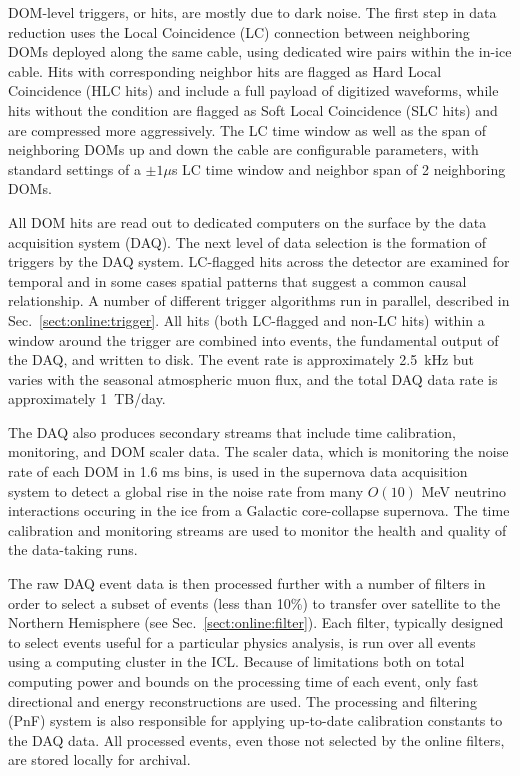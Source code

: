 DOM-level triggers, or hits, are mostly due to dark noise. The first
step in data reduction uses the Local Coincidence (LC) connection between neighboring
DOMs deployed along the same cable, using dedicated wire pairs within the
in-ice cable.  Hits with corresponding
neighbor hits are flagged as Hard Local Coincidence (HLC hits) and
include a full payload of digitized waveforms, while hits without the
condition are flagged as Soft Local Coincidence (SLC hits) and are compressed more aggressively.  The LC time window
as well as the span of neighboring DOMs up and down the cable are
configurable parameters,
with standard settings of a $\pm1 \mu$s LC time window and neighbor
span of 2 neighboring DOMs.

All DOM hits are read out to dedicated computers on the surface by the data
acquisition system (DAQ).  The next level of data selection is the
formation of triggers by the DAQ system.  LC-flagged hits across the
detector are examined for temporal and in some cases spatial patterns that
suggest a common causal relationship.  A number of different trigger
algorithms run in parallel, described in Sec.~\ref{sect:online:trigger}.  All hits
(both LC-flagged and non-LC hits) within a window around the trigger are
combined into events, the fundamental output of the DAQ, and written
to disk.  The event rate is approximately 2.5~kHz but varies with the
seasonal atmospheric muon flux, and the total DAQ data rate is approximately
1~TB/day.

The DAQ also produces secondary streams that include time
calibration, monitoring, and DOM scaler data.  The scaler data, which is
monitoring the noise rate of each DOM in 1.6 ms bins, is used in the
supernova data acquisition system \cite{IC3:supernova} to detect a
global rise in the noise rate from
many $O(10)$ MeV neutrino interactions occuring in the ice from a
Galactic core-collapse supernova.  The time calibration and monitoring
streams are used to monitor the health and quality of the data-taking runs.

The raw DAQ event data is then processed further with a number of
filters in order to select a subset of events (less than 10\%) to
transfer over satellite to the Northern Hemisphere (see
Sec.~\ref{sect:online:filter}).  Each
filter, typically designed to select events useful for a particular physics
analysis, is run
over all events using a computing cluster in the ICL.  Because of
limitations both on total computing power and bounds on the processing time
of each event, only fast directional and energy reconstructions are used.
The processing and filtering (PnF) system is also responsible for applying
up-to-date calibration constants to the DAQ data. All processed events, even those not
selected by the online filters, are stored locally for archival.

